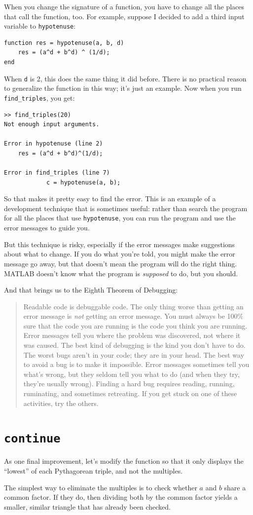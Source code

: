 \documentclass[
]{book}
\newcommand{\displaythrm}[1]{%
    \ifthenelse{\equal{#1}{1}}%
        {Readable code is debuggable code.}{%
    \ifthenelse{\equal{#1}{2}}%
        {The only thing worse than getting an error message is {\em
         not} getting an error message.}{%
    \ifthenelse{\equal{#1}{3}}%
        {You must always be 100\% sure that the code you are running
         is the code you think you are running.}{%
    \ifthenelse{\equal{#1}{4}}%
        {Error messages tell you where the problem was discovered,
         not where it was caused.}{%
    \ifthenelse{\equal{#1}{5}}%
        {The best kind of debugging is the kind you don't have to do.}{%
    \ifthenelse{\equal{#1}{6}}%
        {The worst bugs aren't in your code; they are in your head.}{%
    \ifthenelse{\equal{#1}{7}}%
        {The best way to avoid a bug is to make it impossible.}{%
    \ifthenelse{\equal{#1}{8}}%
        {Error messages sometimes tell you what's wrong, but they
         seldom tell you what to do (and when they try, they're usually
         wrong).}{%
    \ifthenelse{\equal{#1}{9}}%
        {Finding a hard bug requires reading, running, ruminating,
         and sometimes retreating.  If you get stuck on one of these
         activities, try the others.}{%
    {}%
}}}}}}}}}}%
\begin{document}
When you change the signature of a function, you have to change all
the places that call the function, too.  For example, suppose
I decided to add a third input variable to {\tt hypotenuse}:

\begin{verbatim}
function res = hypotenuse(a, b, d)
    res = (a^d + b^d) ^ (1/d);
end
\end{verbatim}

When {\tt d} is 2, this does the same thing it did before.  There is
no practical reason to generalize the function in this way; it's just
an example.  Now when you run {\tt find\_triples}, you get:

\begin{verbatim}
>> find_triples(20)
Not enough input arguments.

Error in hypotenuse (line 2)
    res = (a^d + b^d)^(1/d);

Error in find_triples (line 7)
            c = hypotenuse(a, b);
\end{verbatim}

So that makes it pretty easy to find the error.  This is an example of
a development technique that is sometimes useful: rather
than search the program for all the places that use {\tt hypotenuse},
you can run the program and use the error messages to guide you.

But this technique is risky, especially if the error messages make
suggestions about what to change.  If you do what you're told, you
might make the error message go away, but that doesn't mean the
program will do the right thing.  MATLAB doesn't know what the program
is {\em supposed} to do, but you should.

And that brings us to the Eighth Theorem of Debugging:

\begin{quote}
\displaythrm{8}
\end{quote}


\section{{\tt continue}}

As one final improvement, let's modify the function so that it only
displays the ``lowest'' of each Pythagorean triple, and not the
multiples.

The simplest way to eliminate the multiples is to check whether
$a$ and $b$ share a common factor.  If they do, then dividing both
by the common factor yields a smaller, similar triangle that has
already been checked.
\end{document}
